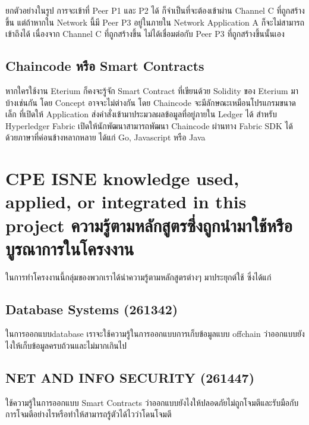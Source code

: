 ยกตัวอย่างในรูป การจะเข้าที่ Peer P1 และ P2 ได้ ก็จำเป็นที่จะต้องเข้าผ่าน Channel C ที่ถูกสร้างขึ้น แต่ถ้าหากใน Network นี้มี Peer P3 อยู่ในภายใน Network Application A ก็จะไม่สามารถเข้าถึงได้ เนื่องจาก Channel C ที่ถูกสร้างขึ้น ไม่ได้เชื่อมต่อกับ Peer P3 ที่ถูกสร้างขึ้นนั้นเอง

\subsection{Chaincode หรือ Smart Contracts}
\cite{Hyperledger_a} 
หากใครใช้งาน Eterium ก็คงจะรู้จัก Smart Contract ที่เขียนด้วย Solidity ของ Eterium มาบ้างเช่นกัน โดย Concept อาจจะไม่ต่างกัน โดย Chaincode จะมีลักษณะเหมือนโปรแกรมขนาดเล็ก ที่เปิดให้ Application ส่งคำสั่งเข้ามาประมวลผลข้อมูลที่อยู่ภายใน Ledger ได้ สำหรับ Hyperledger Fabric เปิดให้นักพัฒนาสามารถพัฒนา Chaincode ผ่านทาง Fabric SDK ได้ด้วยภาษาที่ค่อนข้างหลากหลาย ได้แก่ Go, Javascript หรือ Java

\section{\ifenglish%
\ifcpe CPE \else ISNE \fi knowledge used, applied, or integrated in this project
\else%
ความรู้ตามหลักสูตรซึ่งถูกนำมาใช้หรือบูรณาการในโครงงาน
\fi
}
\enskip \enskip \enskip \enskip \enskip ในการทำโครงงานนี้กลุ่มของพวกเราได้นำความรู้ตามหลักสูตรต่างๆ มาประยุกต์ใช้ ซึ่งได้แก่
\enskip \enskip \enskip \enskip \enskip 
\subsection{Database Systems (261342) }
ในการออกแบบdatabase เราจะใช้ความรู้ในการออกแบบการเก็บข้อมูลแบบ offchain ว่าออกแบบยังไงให้เก็บข้อมูลครบถ้วนและไม่มากเกินไป

\subsection{NET AND INFO SECURITY (261447) }
ใช้ความรู้ในการออกแบบ Smart Contracts ว่าออกแบบยังไงให้ปลอดภัยไม่ถูกโจมตีและรับมือกับการโจมตีอย่างไรหรือทำให้สามารถรู้ตัวได้ไวว่าโดนโจมตี







